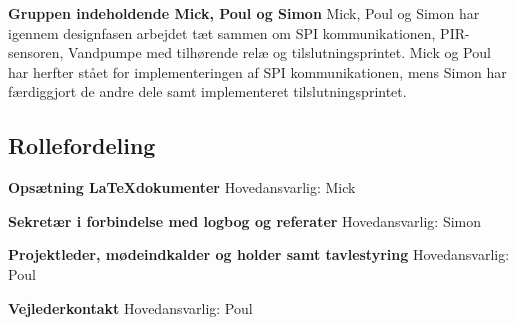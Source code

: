 \textbf{Gruppen indeholdende Mick, Poul og Simon} \newline
Mick, Poul og Simon har igennem designfasen arbejdet tæt sammen om SPI kommunikationen, PIR-sensoren, Vandpumpe med tilhørende relæ og tilslutningsprintet. Mick og Poul har herfter stået for implementeringen af SPI kommunikationen, mens Simon har færdiggjort de andre dele samt implementeret tilslutningsprintet.


\subsection{Rollefordeling}

\textbf{Opsætning \LaTeX dokumenter} \newline
Hovedansvarlig: Mick 

\textbf{Sekretær i forbindelse med logbog og referater} \newline
Hovedansvarlig: Simon

\textbf{Projektleder, mødeindkalder og holder samt tavlestyring } \newline
Hovedansvarlig: Poul

\textbf{Vejlederkontakt} \newline
Hovedansvarlig: Poul   
